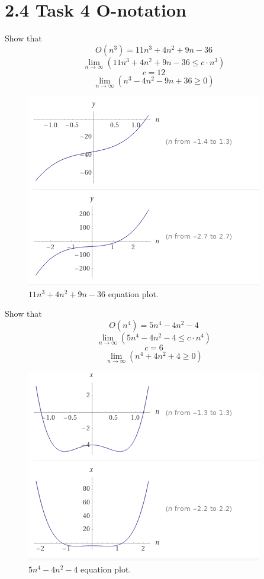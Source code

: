 \documentclass{article}
\begin{document}
\section{2.4 Task 4 O-notation}

Show that 
\[O(n^3)= 11n^3 +4n^2 + 9n - 36\]
\[ \lim_{n\to\infty} (11n^3 +4n^2 + 9n - 36 \leq  c \cdot n^3) \]
\[c = 12\]
\[ \lim_{n\to\infty} (n^3 - 4n^2 - 9n + 36 \geq 0) \]
\begin{figure}[H]
    \centering
    \label{fig:eq1}
    \includegraphics[scale=0.5, angle=0]{eq1.png}
    \caption{$11n^3 + 4n^2 + 9n - 36$ equation plot.}
\end{figure}
Show that 
\[ O(n^4) = 5n^4 - 4n^{2} - 4 \]
\[ \lim_{n\to\infty} (5n^4 - 4n^{2} - 4\leq  c \cdot n^4) \]
\[c = 6\]
\[ \lim_{n\to\infty} (n^4 + 4n^{2} + 4 \geq 0) \]
\begin{figure}[H]
    \centering
    \label{fig:eq2}
    \includegraphics[scale=0.5, angle=0]{eq2.png}
    \caption{$5n^4 - 4n^{2} - 4$ equation plot.}
\end{figure}
\end{document}
